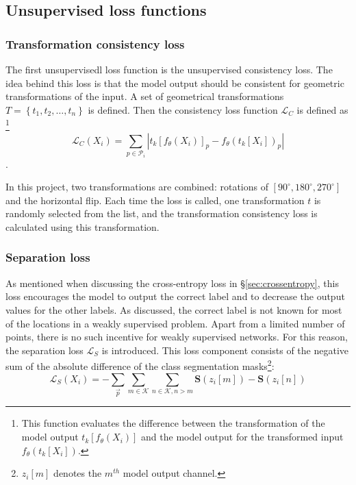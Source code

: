 

\subsection{Unsupervised loss functions}

\subsubsection{Transformation consistency loss}
The first \Gls{unsupervisedl} loss function is the unsupervised consistency loss\cite{Laradji2021}. 
The idea behind this loss is that the model output should be consistent for geometric transformations of the input.
A set of geometrical transformations $T=\left\{ t_1, t_2, \dots, t_n \right\}$ is defined. 
Then the consistency loss function $\mathcal{L}_C$ is defined as
\footnote{This function evaluates the difference between the transformation of the model output $t_k\left[f_\theta(X_i)\right]$ and the model output for the transformed input $f_\theta\left( t_k[X_i] \right)$.}
\begin{equation}
    \mathcal{L}_C(X_i) = \sum_{p \in \mathcal{P}_i} \left| t_k\left[f_\theta(X_i)\right]_p - f_\theta\left( t_k[X_i] \right)_p  \right|  
\end{equation}.

In this project, two transformations are combined: rotations of $[90^{\circ}, 180^{\circ}, 270^{\circ}]$ and the horizontal flip.
Each time the loss is called, one transformation $t$ is randomly selected from the list, and the transformation consistency loss is calculated using this transformation.

\subsubsection{Separation loss}
As mentioned when discussing the cross-entropy loss in §\ref{sec:crossentropy}, this loss encourages the model to output the correct label and to decrease the output values for the other labels.
As discussed, the correct label is not known for most of the locations in a weakly supervised problem.
Apart from a limited number of points, there is no such incentive for weakly supervised networks.
For this reason, the separation loss $\mathcal{L}_S$ is introduced.
This loss component consists of the negative sum of the absolute difference of the class segmentation masks\footnote{$z_i[m]$ denotes the $m^{th}$ model output channel.}:
\begin{equation}
    \mathcal{L}_S(X_i) = - \sum_{\vec{p}} \sum_{m\in \mathcal{K}} \sum_{n \in \mathcal{K}, n>m} \mathbf{S}(z_i[m]) - \mathbf{S}(z_i[n])
\end{equation}

